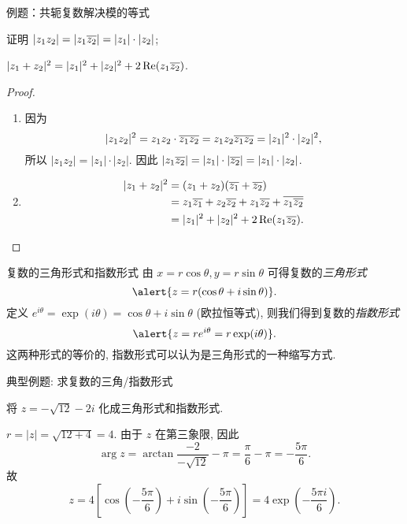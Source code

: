 \begin{frame}{例题：共轭复数解决模的等式}
\begin{example}
证明  $|z_1z_2|=|z_1\overline{z_2}|=|z_1|\cdot|z_2|$;

 $|z_1+z_2|^2=|z_1|^2+|z_2|^2+2\operatorname{Re}(z_1\overline{z_2})$.
\end{example}
\begin{proof}
\begin{enumerate}
\item 因为
\[|z_1z_2|^2=z_1z_2\cdot\overline{z_1z_2}
=z_1z_2\overline{z_1}\overline{z_2}=|z_1|^2\cdot|z_2|^2,\]
\onslide<+->
所以 $|z_1z_2|=|z_1|\cdot|z_2|$.
\onslide<+->
因此 $|z_1\overline{z_2}|=|z_1|\cdot|\overline{z_2}|=|z_1|\cdot|z_2|$.
\item
\begin{align*}
|z_1+z_2|^2&=(z_1+z_2)(\overline{z_1}+\overline{z_2})\\
&=z_1\overline{z_1}+z_2\overline{z_2}+z_1\overline{z_2}+\overline{z_1\overline{z_2}}\\
&=|z_1|^2+|z_2|^2+2\operatorname{Re}(z_1\overline{z_2}).\qedhere
\end{align*}
\end{enumerate}
\vspace{-2\baselineskip}
\end{proof}
\end{frame}


\begin{frame}{复数的三角形式和指数形式}
\onslide<+->
由 $x=r\cos\theta,y=r\sin\theta$ 可得复数的\emph{三角形式}
\[\alert{z=r(\cos\theta+i\sin\theta)}.\]
\onslide<+->
定义 $e^{i\theta}=\exp(i\theta)=\cos\theta+i\sin\theta$ (欧拉恒等式),
\onslide<+->
则我们得到复数的\emph{指数形式}
\[\alert{z=re^{i\theta}=r\exp(i\theta)}.\]
\onslide<+->
这两种形式的等价的, 指数形式可以认为是三角形式的一种缩写方式.
\end{frame}


\begin{frame}{典型例题: 求复数的三角/指数形式}
\begin{example}
将 $z=-\sqrt{12}-2i$ 化成三角形式和指数形式.
\end{example}
\begin{solution}
$r=|z|=\sqrt{12+4}=4$.
\onslide<+->
由于 $z$ 在第三象限,
\onslide<+->
因此
\[\arg z=\arctan\frac{-2}{-\sqrt{12}}-\pi=\frac\pi6-\pi=-\frac{5\pi}6.\]
\onslide<+->
故
\[z=4\left[\cos\left(-\frac{5\pi}6\right)+i\sin\left(-
\frac{5\pi}6\right)\right]=4\exp\left(-\frac{5\pi i}6\right).\]
\end{solution}
\end{frame}


